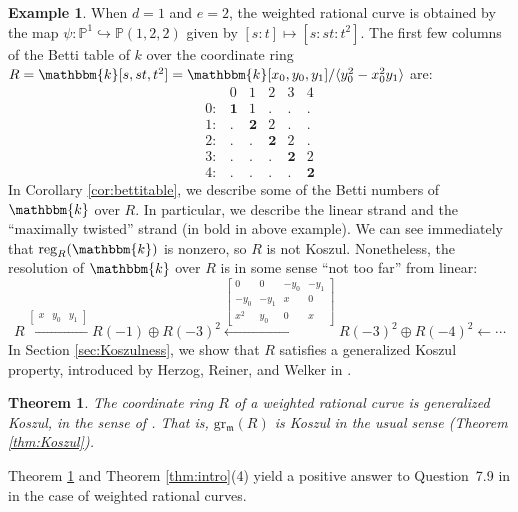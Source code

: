 \documentclass[12pt,reqno]{amsart}
\newtheorem{introtheorem}{Theorem}
\theoremstyle{definition}
\newtheorem{example}[theorem]{Example}
\theoremstyle{remark}
\DeclareMathOperator{\reg}{reg}
\newcommand{\grm}{\operatorname{gr_\frakm}}
\newcommand{\grmR}{{\grm(R)}}
\newcommand{\bbk}{\mathbbm{k}}
\newcommand{\frakm}{{\mathfrak{m}}}
\newcommand{\ideal}[1]{{\langle #1 \rangle}}
\begin{document}
\begin{example}
    When $d=1$ and $e=2$, the weighted rational curve is obtained by the map $\psi: \mathbb P^1 \hookrightarrow \mathbb P(1,2,2)$ given by $[s:t] \mapsto [s:st:t^2]$. The first few columns of the Betti table of $k$ over the coordinate ring $R = \bbk[s,st,t^2] = \bbk[x_0, y_0, y_1]/\ideal{y_0^2 - x_0^2y_1}$ are:
\[
\begin{matrix}
 & 0 & 1 & 2 & 3 & 4\\
0: & \mathbf{1} & 1 & . & . & .\\
1: & . & \mathbf{2} & 2 & . & .\\
2: & . & . & \mathbf{2} & 2 & .\\
3: & . & . & . & \mathbf{2} & 2\\
4: & . & . & . & . & \mathbf{2}
\end{matrix}
\]
In Corollary \ref{cor:bettitable}, we describe some of the Betti numbers of $\bbk$ over $R$.  In particular, we describe the linear strand and the ``maximally twisted'' strand (in bold in above example).  We can see immediately that $\reg_R(\bbk)$ is nonzero, so $R$ is not Koszul.  Nonetheless, the resolution of $\bbk$ over $R$ is in some sense ``not too far'' from linear: 
\[
R \xleftarrow{\begin{bmatrix} x & y_0 & y_1 \end{bmatrix}} R(-1)\oplus R(-3)^2 \xleftarrow{\begin{bmatrix} 0 & 0 & -y_0 & -y_1\\ -y_0 & -y_1 & x & 0\\ x^2 & y_0 & 0 & x \end{bmatrix}} R(-3)^2\oplus R(-4)^2 \gets \cdots 
\]
In Section \ref{sec:Koszulness}, we show that $R$ satisfies a generalized Koszul property, introduced by Herzog, Reiner, and Welker in \cite[Definition~5.1]{hrwTKoszulPropIAffSemigroupRings}.
\end{example}

\begin{introtheorem}
\label{thm:IntroKoszul}
    The coordinate ring $R$ of a weighted rational curve is generalized Koszul, in the sense of \cite{hrwTKoszulPropIAffSemigroupRings}.  That is, $\grmR$ is Koszul in the usual sense (Theorem \ref{thm:Koszul}).
\end{introtheorem}

Theorem \ref{thm:IntroKoszul} and Theorem \ref{thm:intro}(4) yield a positive answer to Question~7.9 in \cite{beLinSyzOCurvesIWProjSp} in the case of weighted rational curves. 
\end{document}
